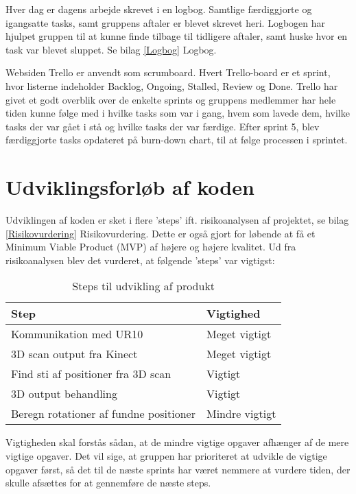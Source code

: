 Hver dag er dagens arbejde skrevet i en logbog. Samtlige færdiggjorte og igangsatte tasks, samt gruppens aftaler er blevet skrevet heri. Logbogen har hjulpet gruppen til at kunne finde tilbage til tidligere aftaler, samt huske hvor en task var blevet sluppet. Se bilag \ref{Logbog} Logbog.  

Websiden Trello er anvendt som scrumboard. Hvert Trello-board er et sprint, hvor listerne indeholder Backlog, Ongoing, Stalled, Review og Done. Trello har givet et godt overblik over de enkelte sprints og gruppens medlemmer har hele tiden kunne følge med i hvilke tasks som var i gang, hvem som lavede dem, hvilke tasks der var gået i stå og hvilke tasks der var færdige. Efter sprint 5, blev færdiggjorte tasks opdateret på burn-down chart, til at følge processen i sprintet. 
\newpage

\section{Udviklingsforløb af koden}
Udviklingen af koden er sket i flere 'steps' ift. risikoanalysen af projektet, se bilag \ref{Risikovurdering} Risikovurdering. Dette er også gjort for løbende at få et Minimum Viable Product (MVP) af højere og højere kvalitet. 
Ud fra risikoanalysen blev det vurderet, at følgende 'steps' var vigtigst:

\begin{table}[h]
\centering
\begin{tabular}{|l| p{}|}
\hline
\textbf{Step} &  \textbf{Vigtighed} \\\hline
	Kommunikation med UR10 & Meget vigtigt \\\hline
	3D scan output fra Kinect & Meget vigtigt\\\hline
	Find sti af positioner fra 3D scan & Vigtigt \\\hline
	3D output behandling & Vigtigt \\\hline
	Beregn rotationer af fundne positioner & Mindre vigtigt \\\hline
\end{tabular}
\caption{Steps til udvikling af produkt}
\end{table}

Vigtigheden skal forstås sådan, at de mindre vigtige opgaver afhænger af de mere vigtige opgaver. 
Det vil sige, at gruppen har prioriteret at udvikle de vigtige opgaver først, så det til de næste sprints har været nemmere at vurdere tiden, der skulle afsættes for at gennemføre de næste steps.

